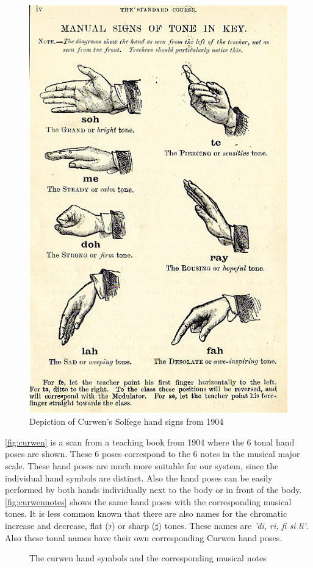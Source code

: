 \begin{figure}[htbp]
	\centering{}
	\includegraphics[width=0.4\linewidth]{figures/curwen.jpg}
	\caption{Depiction of Curwen's Solfege hand signs from 1904}
	\label{fig:curwen}
\end{figure}

\autoref{fig:curwen} is a scan from a teaching book from 1904 where the 6 tonal hand poses are shown. These 6 poses correspond to the 6 notes in the musical major scale. These hand poses are much more suitable for our system, since the individual hand symbols are distinct. Also the hand poses can be easily performed by both hands individually next to the body or in front of the body. \autoref{fig:curwennotes} shows the same hand poses with the corresponding musical tones. It is less common known that there are also names for the chromatic increase and decrease, flat ($\flat$) or sharp ($\sharp$) tones. These names are \emph{'di, ri, fi si li'}. Also these tonal names have their own corresponding Curwen hand poses.

\begin{figure}[htbp]
	\center{}
	\hspace{0.03\linewidth}
	\caption{The curwen hand symbols and the corresponding musical notes}
	\label{fig:curwennotes}
\end{figure}


